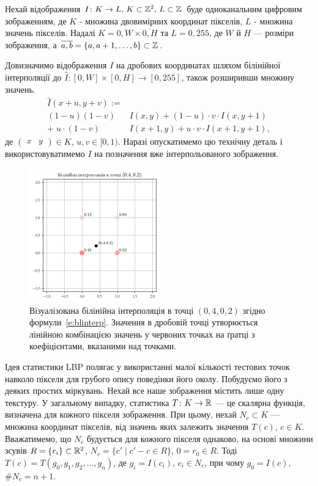 Нехай відображення \(I \colon K \to L$, $K \subset \Z^2$, $L \subset \Z\) 
буде одноканальним цифровим зображенням, 
де $K$ - множина двовимірних координат пікселів, $L$ - множина значень пікселів.
Надалі $K = \overline{0,W} \times \overline{0,H}$ та $L = \overline{0,255}$, 
де $W$ й $H$ --- розміри зображення, а $\overline{a,b} = \{a, a+1, \dots , b\} \subset \mathbb Z$.

Довизначимо відображення $I$ на дробових координатах шляхом білінійної інтерполяції до $\hat I \colon [0,W] \times [0,H] \to [0,255]$, також розширивши множину значень.
\begin{equation}\label{e:blinterp}
\begin{split}
    \hat I(x+u,y+v) := \\
    (1 - u)(1 - v) & I(x,y) + (1-u) \cdot v \cdot I(x,y+1)\\ 
    + \; u \cdot (1-v) & I(x+1,y) + u \cdot v \cdot  I(x+1,y+1),
\end{split}
\end{equation}
де $\begin{pmatrix} x & y \end{pmatrix} \in K$, $u,v \in [0,1)$. 
Наразі опускатимемо цю технічну деталь і використовуватимемо $I$ на позначення вже інтерпольованого зображення.

\begin{figure}[h]
    \centering
    \includegraphics[width=0.5\textwidth]{img/bilinear-interpolation-1.png}
    \caption{
        Візуалізована білінійна інтерполяція в точці $(0{,}4,0{,}2)$ згідно формули~\eqref{e:blinterp}. 
        Значення в дробовій точці утворюється лінійною комбінацією значень у червоних точках на ґратці
        з коефіцієнтами, вказаними над точками.
    }
    \label{fig:bilinear-interp}
\end{figure}

Ідея статистики LBP \cite{ojala2002} полягає у використанні малої кількості тестових точок навколо пікселя для грубого опису поведінки його околу.
Побудуємо його з деяких простих міркувань.
Нехай все наше зображення містить лише одну текстуру.
У загальному випадку, статистика $T \colon K \to \mathbb R$ --- це скалярна функція, визначена для кожного пікселя зображення. 
При цьому, нехай $N_c \subset K$ --- множина координат пікселів, від значень яких залежить значення $T(c)$, $c \in K$. 
Вважатимемо, що $N_c$ будується для кожного пікселя однаково, на основі множини зсувів $R = \{r_i\} \subset \mathbb R^2$, $N_c = \{c' \mid c' - c \in R\}$, $0 = r_0 \in R$.
Тоді $T(c) = T(g_0, g_1, g_2, \dots, g_n)$, де $g_i = I(c_i)$, $c_i \in N_c$, при чому $g_0 = I(c)$, $\# N_c = n+1$.

